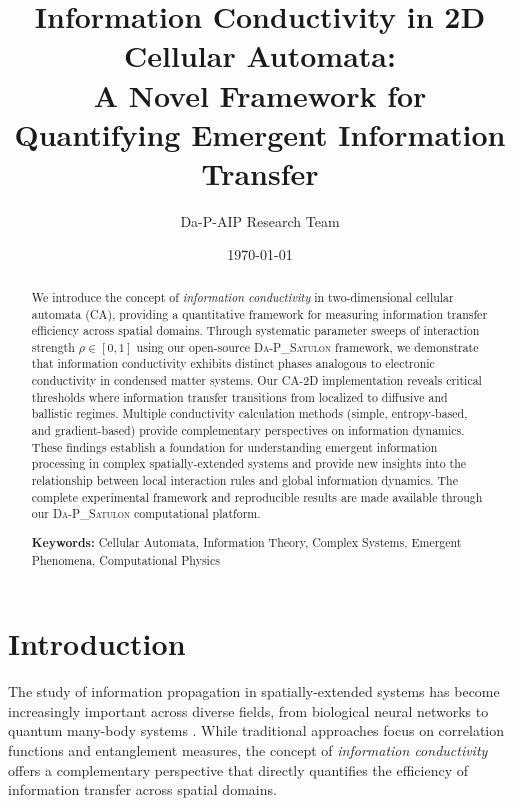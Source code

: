 \documentclass[twocolumn,showpacs,preprintnumbers,amsmath,amssymb,prb]{revtex4-2}
\newcommand{\satulon}{\textsc{Da-P\_Satulon}}
\newcommand{\rhointer}{\rho}
\begin{document}

\title{Information Conductivity in 2D Cellular Automata: \\
A Novel Framework for Quantifying Emergent Information Transfer}

\author{Da-P-AIP Research Team}

\date{\today}

\begin{abstract}
We introduce the concept of \emph{information conductivity} in two-dimensional cellular automata (CA), providing a quantitative framework for measuring information transfer efficiency across spatial domains. Through systematic parameter sweeps of interaction strength $\rhointer \in [0,1]$ using our open-source \satulon{} framework, we demonstrate that information conductivity exhibits distinct phases analogous to electronic conductivity in condensed matter systems. Our CA-2D implementation reveals critical thresholds where information transfer transitions from localized to diffusive and ballistic regimes. Multiple conductivity calculation methods (simple, entropy-based, and gradient-based) provide complementary perspectives on information dynamics. These findings establish a foundation for understanding emergent information processing in complex spatially-extended systems and provide new insights into the relationship between local interaction rules and global information dynamics. The complete experimental framework and reproducible results are made available through our \satulon{} computational platform.

\textbf{Keywords:} Cellular Automata, Information Theory, Complex Systems, Emergent Phenomena, Computational Physics
\end{abstract}


\maketitle

\section{Introduction}
\label{sec:introduction}

The study of information propagation in spatially-extended systems has become increasingly important across diverse fields, from biological neural networks to quantum many-body systems \cite{nielsen2010quantum}. While traditional approaches focus on correlation functions and entanglement measures, the concept of \emph{information conductivity} offers a complementary perspective that directly quantifies the efficiency of information transfer across spatial domains.
\end{document}
